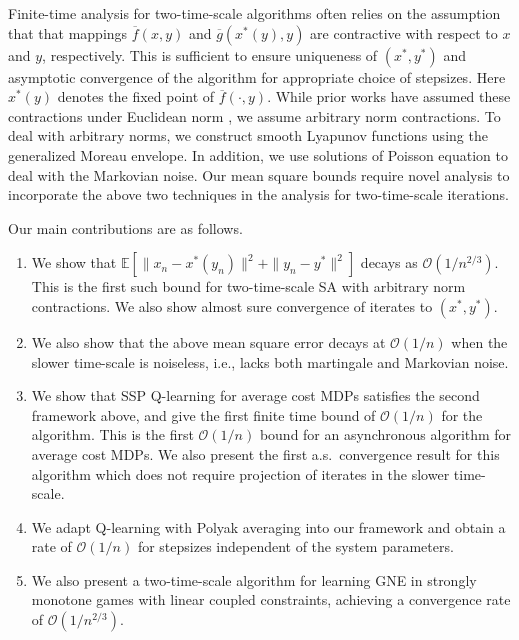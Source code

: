 \documentclass[letterpaper, 10 pt, conference]{ieeeconf}  %
\theoremstyle{definition}
\theoremstyle{plain}
\newcommand{\barf}{\overline{f}}
\newcommand{\barg}{\overline{g}}
\newcommand{\xstar}{x^*}
\newcommand{\ystar}{y^*}
\newcommand{\EE}{\mathbb{E}}
\begin{document}
Finite-time analysis for two-time-scale algorithms often relies on the assumption that that mappings $\barf(x,y)$ and $\barg(\xstar(y),y)$ are contractive with respect to $x$ and $y$, respectively. This is sufficient to ensure uniqueness of $(\xstar,\ystar)$ and asymptotic convergence of the algorithm for appropriate choice of stepsizes. Here $\xstar(y)$ denotes the fixed point of $\barf(\cdot,y)$. While prior works have assumed these contractions under Euclidean norm \cite{Doan}, we assume arbitrary norm contractions. To deal with arbitrary norms, we construct smooth Lyapunov functions using the generalized Moreau envelope. In addition, we use solutions of Poisson equation to deal with the Markovian noise. Our mean square bounds require novel analysis to incorporate the above two techniques in the analysis for two-time-scale iterations. 

Our main contributions are as follows.
\begin{enumerate}
    \item We show that $\EE[\|x_n-\xstar(y_n)\|^2+\|y_n-\ystar\|^2]$ decays as $\mathcal{O}(1/n^{2/3})$. This is the first such bound for two-time-scale SA with arbitrary norm contractions. We also show almost sure convergence of iterates to $(\xstar,\ystar)$.
    \item We also show that the above mean square error decays at $\mathcal{O}(1/n)$ when the slower time-scale is noiseless, i.e., lacks both martingale and Markovian noise.
    \item We show that SSP Q-learning for average cost MDPs satisfies the second framework above, and give the first finite time bound of $\mathcal{O}(1/n)$ for the algorithm. This is the first $\mathcal{O}(1/n)$ bound for an asynchronous algorithm for average cost MDPs. We also present the first a.s.\ convergence result for this algorithm which does not require projection of iterates in the slower time-scale.
    \item We adapt Q-learning with Polyak averaging into our framework and obtain a rate of $\mathcal{O}(1/n)$ for stepsizes independent of the system parameters.
    \item We also present a two-time-scale algorithm for learning GNE in strongly monotone games with linear coupled constraints, achieving a convergence rate of $\mathcal{O}(1/n^{2/3})$.
\end{enumerate}
\end{document}
